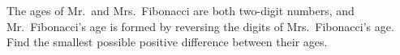 The ages of Mr.\ and Mrs.\ Fibonacci are both two-digit numbers, and Mr.\ Fibonacci's age is formed by reversing the digits of Mrs.\ Fibonacci's age. Find the smallest possible positive difference between their ages.
